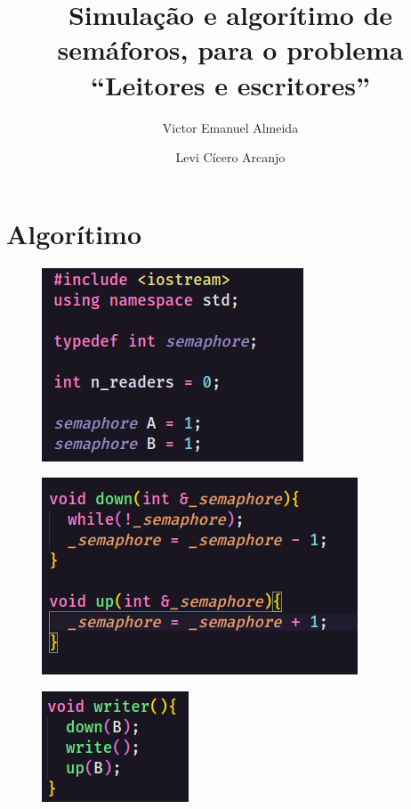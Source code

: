 \documentclass[12pt, a4paper]{article}
\author{Victor Emanuel Almeida \and Levi Cícero Arcanjo}
\title{Simulação e algorítimo de semáforos, para o problema ``Leitores e escritores''}
\begin{document}
\maketitle\thispagestyle{fancy}

\section{Algorítimo}
\begin{figure}[!htb]
	\centering
	\includegraphics[keepaspectratio]{1.png}
	\caption{\label{fig:1.png}}
\end{figure}

\begin{figure}[!htb]
	\centering
	\includegraphics[keepaspectratio]{2.png}
	\caption{\label{fig:2.png}}
\end{figure}

\begin{figure}[!htb]
	\centering
	\includegraphics[keepaspectratio]{3.png}
	\caption{\label{fig:}}
\end{figure}
\end{document}
